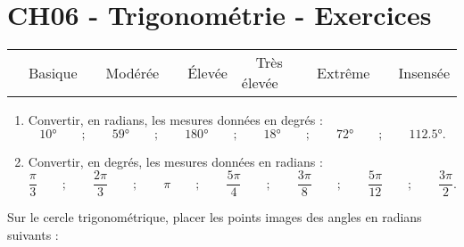 \documentclass[a4paper,11pt]{article}
\author{Pierquet}
\title{\nomfichier}
\begin{document}


\pagestyle{fancy}

\part{CH06 - Trigonométrie - Exercices}

\medskip

\begin{caide}
{\setlength\arrayrulewidth{1.5pt} 
\begin{tabularx}{0.95\linewidth}{Y|Y|Y|Y|Y|Y}
	~~\textsf{Basique} & ~~\textsf{Modérée} & ~~\textsf{Élevée} & ~~\textsf{Très élevée} & ~~\textsf{Extrême} & ~~\textsf{Insensée} \\
\end{tabularx}}
\end{caide}


\begin{enumerate}
	\item Convertir, en radians, les mesures données en degrés :\[\ang{10} \qquad ; \qquad \ang{59} \qquad ; \qquad \ang{180} \qquad ; \qquad \ang{18} \qquad ; \qquad \ang{72} \qquad ; \qquad \ang{112,5}.\]
	\item Convertir, en degrés, les mesures données en radians :\[ \dfrac{\pi}{3} \qquad ; \qquad \dfrac{2\pi}{3} \qquad ; \qquad \pi \qquad ; \qquad \dfrac{5\pi}{4} \qquad ; \qquad \dfrac{3\pi}{8} \qquad ; \qquad \dfrac{5\pi}{12} \qquad ; \qquad \dfrac{3\pi}{2}.\]
\end{enumerate}

\medskip


\medskip

Sur le cercle trigonométrique, placer les points images des angles en radians suivants :

\smallskip
\end{document}
